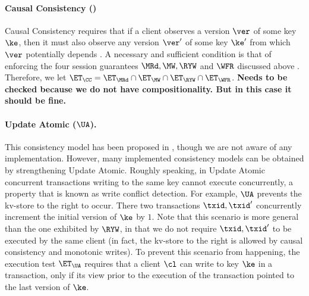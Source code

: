 \paragraph{Causal Consistency (\CC)}
Causal Consistency requires that if a client observes a version 
$\ver$ of some key $\ke$, then it must also observe any version $\ver'$ of some key $\ke'$ 
from which $\ver$ potentially depends \cite{cops}. A necessary and sufficient condition
is that of enforcing the four session guarantees $\MRd, \MW, \RYW$ and $\WFR$ 
discussed above \cite{session2causal}. Therefore, we let $\ET_{\CC} = \ET_{\MRd} \cap \ET_{\MW} 
\cap \ET_{\RYW} \cap \ET_{\WFR}$. 
\textbf{\color{red} Needs to be checked because we do not have compositionality. But in this case 
it should be fine.}

\paragraph{Update Atomic ($\UA$).}
This consistency model has been proposed in \cite{framework-concur}, though we 
are not aware of any implementation. However, many implemented consistency models 
can be obtained by strengthening Update Atomic. Roughly speaking, in Update Atomic 
concurrent transactions writing to the same key cannot execute concurrently, a property 
that is known as write conflict detection. For example, $\UA$ prevents the kv-store to 
the right to occur. There two transactions $\txid, \txid'$ concurrently increment the initial 
version of $\ke$ by $1$. Note that this scenario is more general than the one exhibited by 
$\RYW$, in that we do not require $\txid, \txid'$ to be executed by the same client 
(in fact, the kv-store to the right is allowed by causal consistency and monotonic writes).
To prevent this scenario from happening, the execution test $\ET_{\UA}$ requires 
that a client $\cl$ can write to key $\ke$ in a transaction, only if its view prior 
to the execution of the transaction pointed to the last version of $\ke$.

